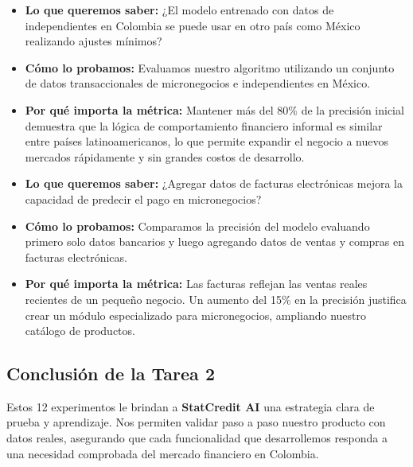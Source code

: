 \documentclass[11pt,a4paper]{article}
\begin{document}
\begin{tcolorbox}[colback=lightgray,colframe=secondary,title=\textbf{Experimento 6.1: Prueba de adaptación del algoritmo a otro país (México)}]
\begin{itemize}[leftmargin=*]
    \item \textbf{Lo que queremos saber:} ¿El modelo entrenado con datos de independientes en Colombia se puede usar en otro país como México realizando ajustes mínimos?
    \item \textbf{Cómo lo probamos:} Evaluamos nuestro algoritmo utilizando un conjunto de datos transaccionales de micronegocios e independientes en México.
    \item \textbf{Por qué importa la métrica:} Mantener más del 80\% de la precisión inicial demuestra que la lógica de comportamiento financiero informal es similar entre países latinoamericanos, lo que permite expandir el negocio a nuevos mercados rápidamente y sin grandes costos de desarrollo.
\end{itemize}
\end{tcolorbox}

\begin{tcolorbox}[colback=lightgray,colframe=secondary,title=\textbf{Experimento 6.2: Inclusión de datos de facturación electrónica (DIAN)}]
\begin{itemize}[leftmargin=*]
    \item \textbf{Lo que queremos saber:} ¿Agregar datos de facturas electrónicas mejora la capacidad de predecir el pago en micronegocios?
    \item \textbf{Cómo lo probamos:} Comparamos la precisión del modelo evaluando primero solo datos bancarios y luego agregando datos de ventas y compras en facturas electrónicas.
    \item \textbf{Por qué importa la métrica:} Las facturas reflejan las ventas reales recientes de un pequeño negocio. Un aumento del 15\% en la precisión justifica crear un módulo especializado para micronegocios, ampliando nuestro catálogo de productos.
\end{itemize}
\end{tcolorbox}

\subsection{Conclusión de la Tarea 2}
Estos 12 experimentos le brindan a \textbf{StatCredit AI} una estrategia clara de prueba y aprendizaje. Nos permiten validar paso a paso nuestro producto con datos reales, asegurando que cada funcionalidad que desarrollemos responda a una necesidad comprobada del mercado financiero en Colombia.
\end{document}

